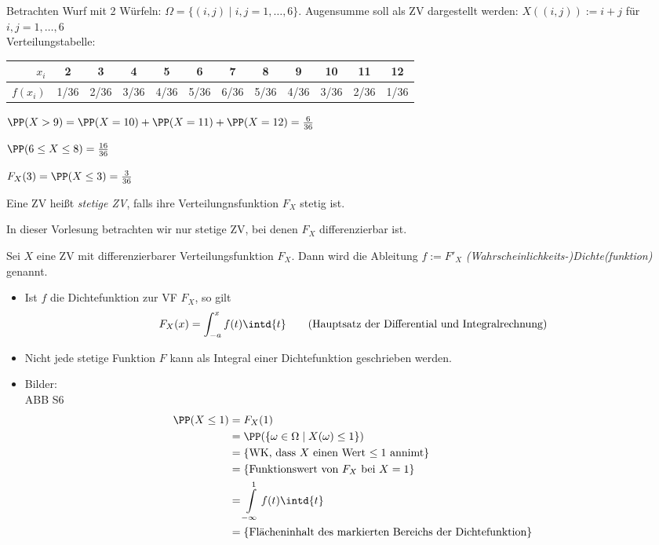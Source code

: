  Betrachten Wurf mit 2 Würfeln: $\Omega=\{(i,j)\;|\; i,j=1,\dots,6\}$. Augensumme soll als ZV dargestellt werden: $X((i,j)):=i+j$ für $i,j=1,\dots,6$\\
Verteilungstabelle:\\
\begin{tabular}{r | c | c| c| c| c| c| c| c| c| c| c}
$x_i$ & 2 & 3 & 4 & 5 & 6 & 7 & 8 & 9  & 10 & 11 & 12\\
\hline
$f(x_i)$ & 1/36 & 2/36 & 3/36 & 4/36 & 5/36 & 6/36 & 5/36 & 4/36 & 3/36 & 2/36 & 1/36
\end{tabular}
\begin{anumerate}
\item $\PP(X>9) = \PP(X=10) + \PP(X=11) + \PP(X=12) = \frac{6}{36}$
\item $\PP(6\leq X \leq 8) = \frac{16}{36}$
\item $F_X(3) = \PP(X\leq 3) = \frac{3}{36}$
\end{anumerate}

 Eine ZV heißt \emph{stetige ZV}, falls ihre Verteilungnsfunktion $F_X$ stetig ist.

In dieser Vorlesung betrachten wir nur stetige ZV, bei denen $F_X$ differenzierbar ist.

 Sei $X$ eine ZV mit differenzierbarer Verteilungsfunktion $F_X$. Dann wird die Ableitung $f:= F'_X$ \emph{(Wahrscheinlichkeits-)Dichte(funktion)} genannt.

\begin{itemize}
\item Ist $f$ die Dichtefunktion zur VF $F_X$, so gilt
$$F_X(x) = \int_{-a}^x f(t) \intd{t} \qquad \text{(Hauptsatz der Differential und Integralrechnung)}$$
\item Nicht jede stetige Funktion $F$ kann als Integral einer Dichtefunktion geschrieben werden.
\item Bilder:\\
ABB S6
\begin{align*}
\PP(X\leq 1)&=F_X(1)\\
&=\PP(\{\omega \in \Omega \;|\; X(\omega)\leq 1 \}) \\
&= \{\text{WK, dass $X$ einen Wert $\leq 1$ annimt}\}\\
&=\{\text{Funktionswert von $F_X$ bei $X=1$}\}\\
&=\int\limits_{-\infty}^1 f(t)\intd{t}\\
&=\{\text{Flächeninhalt des markierten Bereichs der Dichtefunktion}\}
\end{align*}
\end{itemize}

